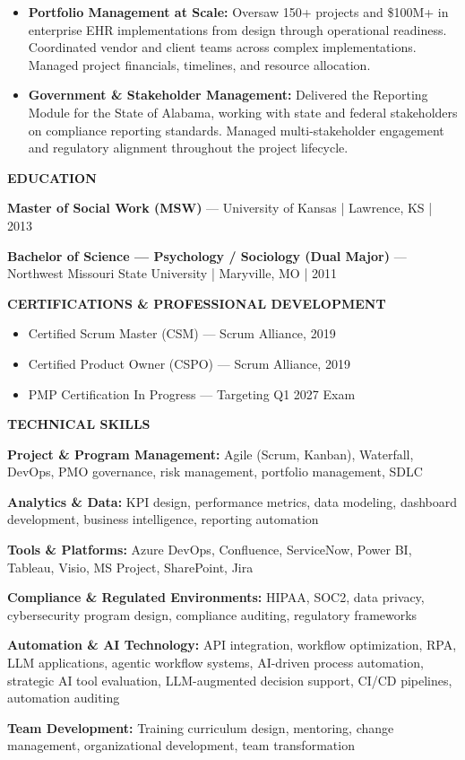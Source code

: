 \documentclass[10pt,letterpaper]{article}
\begin{document}
\begin{itemize}
\item \textbf{Portfolio Management at Scale:} Oversaw 150+ projects and \$100M+ in enterprise EHR implementations from design through operational readiness. Coordinated vendor and client teams across complex implementations. Managed project financials, timelines, and resource allocation.

\item \textbf{Government \& Stakeholder Management:} Delivered the Reporting Module for the State of Alabama, working with state and federal stakeholders on compliance reporting standards. Managed multi-stakeholder engagement and regulatory alignment throughout the project lifecycle.
\end{itemize}

\vspace{6pt}

\textbf{EDUCATION}

\textbf{Master of Social Work (MSW)} --- University of Kansas | Lawrence, KS | 2013

\textbf{Bachelor of Science --- Psychology / Sociology (Dual Major)} --- Northwest Missouri State University | Maryville, MO | 2011

\vspace{6pt}

\textbf{CERTIFICATIONS \& PROFESSIONAL DEVELOPMENT}

\begin{itemize}
\item Certified Scrum Master (CSM) --- Scrum Alliance, 2019
\item Certified Product Owner (CSPO) --- Scrum Alliance, 2019
\item PMP Certification In Progress --- Targeting Q1 2027 Exam
\end{itemize}

\vspace{6pt}

\textbf{TECHNICAL SKILLS}

\textbf{Project \& Program Management:} Agile (Scrum, Kanban), Waterfall, DevOps, PMO governance, risk management, portfolio management, SDLC

\textbf{Analytics \& Data:} KPI design, performance metrics, data modeling, dashboard development, business intelligence, reporting automation

\textbf{Tools \& Platforms:} Azure DevOps, Confluence, ServiceNow, Power BI, Tableau, Visio, MS Project, SharePoint, Jira

\textbf{Compliance \& Regulated Environments:} HIPAA, SOC2, data privacy, cybersecurity program design, compliance auditing, regulatory frameworks

\textbf{Automation \& AI Technology:} API integration, workflow optimization, RPA, LLM applications, agentic workflow systems, AI-driven process automation, strategic AI tool evaluation, LLM-augmented decision support, CI/CD pipelines, automation auditing

\textbf{Team Development:} Training curriculum design, mentoring, change management, organizational development, team transformation
\end{document}
